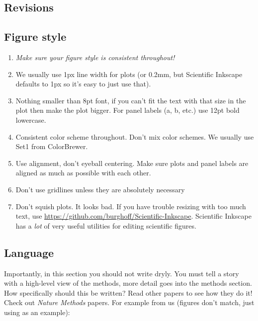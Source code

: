\begin{refsegment}
\subsection*{Revisions}


\subsection*{Figure style}

\begin{enumerate}
\item \textit{Make sure your figure style is consistent throughout!}
\item We usually use 1px line width for plots (or 0.2mm, but Scientific Inkscape
  defaults to 1px so it's easy to just use that).
\item Nothing smaller than 8pt font, if you can't fit the text with that size in
  the plot then make the plot bigger. For panel labels (a, b, etc.) use 12pt
  bold lowercase.
\item Consistent color scheme throughout. Don't mix color schemes. We usually
  use Set1 from ColorBrewer.
\item Use alignment, don't eyeball centering. Make sure plots and panel labels
  are aligned as much as possible with each other.
\item Don't use gridlines unless they are absolutely necessary
\item Don't squish plots. It looks bad. If you have trouble resizing with too
  much text, use \url{https://github.com/burghoff/Scientific-Inkscape}.
  Scientific Inkscape has a \textit{lot} of very useful utilities for editing
  scientific figures.
\end{enumerate}

\subsection*{Language}

Importantly, in this section you should not write dryly. You must tell a story
with a high-level view of the methods, more detail goes into the methods
section. How specifically should this be written? Read other papers to see how
they do it! Check out \textit{Nature Methods} papers. For example from us
(figures don't match, just using as an example):


\end{refsegment}
